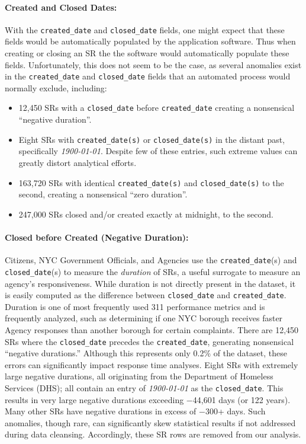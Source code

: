 \documentclass[linenumber]{jdsart}
\begin{document}
\paragraph{Created and Closed Dates:}
\label{sec:negativeduration}
With the \texttt{created\_date} and \texttt{closed\_date} fields, one 
might expect that these fields would be automatically populated by the  
application software. Thus when creating  or closing an SR 
the the software would automatically populate these fields. 
Unfortunately, this does not seem to be the case, as several anomalies 
exist in the \texttt{created\_date} and \texttt{closed\_date} fields that
an automated process would normally exclude, including:
\begin{itemize}[left=1.5em]
    \item 12,450 SRs with a \texttt{closed\_date} before \texttt{created\_date} creating a nonsensical ``negative duration''. 
    \item Eight SRs with \texttt{created\_date(s)} or \texttt{closed\_date(s)} in 
    the distant past, specifically  \textit{1900-01-01}. Despite few of 
    these entries, such extreme values can greatly distort analytical efforts. 
    \item 163,720 SRs with identical \texttt{created\_date(s)} and \texttt{closed\_date(s)} 
    to the second, creating a nonsensical ``zero duration''. 
    \item 247,000 SRs closed and/or created exactly at midnight, to the second.
\end{itemize}


\paragraph{Closed before Created (Negative Duration):}
Citizens, NYC Government Officials, and Agencies use the \texttt{created\_date}(s) and 
\texttt{closed\_date}(s) to measure the \textit{duration} of SRs, 
a useful surrogate to measure an agency's responsiveness. 
While duration is not directly present in the dataset, 
it is easily computed as the difference between
\texttt{closed\_date} and \texttt{created\_date}.  Duration is one of 
most frequently used 311 performance metrics 
and is frequently analyzed, such as determining if 
one NYC borough receives faster Agency responses than 
another borough for certain complaints. There are 
12,450 SRs where the \texttt{closed\_date} precedes the 
\texttt{created\_date}, generating nonsensical ``negative durations.'' 
Although this represents only 0.2\% of the dataset, these errors can 
significantly impact response time analyses. Eight SRs with extremely 
large negative durations, all originating from the 
Department of Homeless Services (DHS); all contain an entry 
of \textit{1900-01-01} as the \texttt{closed\_date}. This results 
in very large negative durations exceeding $-$44,601 
days (or 122 years). Many other SRs have negative durations 
in excess of $-$300+ days. Such anomalies, though rare, can 
significantly skew statistical results if not addressed during 
data cleansing. Accordingly, these SR rows are removed from our analysis. 
\end{document}
